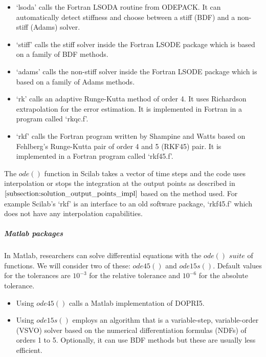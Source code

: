 \begin{itemize}
\item `lsoda' calls the Fortran LSODA routine from ODEPACK. It can automatically detect stiffness and choose between a stiff (BDF) and a non-stiff (Adams) solver.

\item `stiff' calls the stiff solver inside the Fortran LSODE package which is based on a family of BDF methods.

\item `adams' calls the non-stiff solver inside the Fortran LSODE package which is based on a family of Adams methods.

\item `rk' calls an adaptive Runge-Kutta method of order 4. It uses Richardson extrapolation for the error estimation. It is implemented in Fortran in a program called `rkqc.f'.

\item `rkf' calls the Fortran program written by Shampine and Watts based on Fehlberg's Runge-Kutta pair of order 4 and 5 (RKF45) pair. It is implemented in a Fortran program called `rkf45.f'.
\end{itemize}

The $ode()$ function in Scilab takes a vector of time steps and the code uses interpolation or stops the integration at the output points as described in $\ref{subsection:solution_output_points_impl}$ based on the method used. For example Scilab's `rkf' is an interface to an old software package, `rkf45.f' which does not have any interpolation capabilities.

\subparagraph{Matlab packages}
In Matlab, researchers can solve differential equations with the $ode()$ $suite$ \cite{shampine1997matlab} of functions. We will consider two of these: $ode45()$ and $ode15s()$.
Default values for the tolerances are $10^{-3}$ for the relative tolerance and $10^{-6}$ for the absolute tolerance.

\begin{itemize}
\item Using $ode45()$ calls a Matlab implementation of DOPRI5.

\item Using $ode15s()$ employs an algorithm that is a variable-step, variable-order (VSVO) solver based on the numerical differentiation formulas (NDFs) of orders 1 to 5. Optionally, it can use BDF methods but these are usually less efficient.
\end{itemize}

